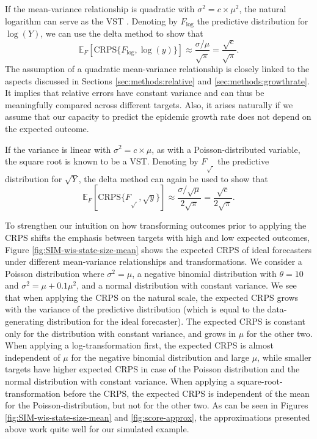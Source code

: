 \documentclass{article}
\begin{document}
If the mean-variance relationship is quadratic with $\sigma^2 = c \times \mu^2$, the natural logarithm can serve as the VST \citep{guerreroTimeseriesAnalysisSupported1993}. Denoting by $F_{\log}$ the predictive distribution for $\log(Y)$, we can use the delta method to show that
$$
\mathbb{E}_F[\text{CRPS}\{F_{\log}, \log(y)\}] \approx \frac{\sigma/\mu}{\sqrt{\pi}} 
= \frac{\sqrt{c}}{\sqrt{\pi}}
.
$$
The assumption of a quadratic mean-variance relationship is closely linked to the aspects discussed in Sections \ref{sec:methods:relative} and \ref{sec:methods:growthrate}. It implies that relative errors have constant variance and can thus be meaningfully compared across different targets. Also, it arises naturally if we assume that our capacity to predict the epidemic growth rate does not depend on the expected outcome.

If the variance is linear with $\sigma^2 = c \times \mu$, as with a Poisson-distributed variable, the square root is known to be a VST. 
Denoting by $F_{\sqrt{\ }}$ the predictive distribution for $\sqrt{Y}$, the delta method can again be used to show that
$$
\mathbb{E}_F[\text{CRPS}\{F_{\sqrt{\ }}, \sqrt{y}\}] \approx \frac{\sigma/\sqrt{\mu}}{2\sqrt{\pi}} = \frac{\sqrt{c}}{2\sqrt{\pi}}
.
$$

To strengthen our intuition on how transforming outcomes prior to applying the CRPS shifts the emphasis between targets with high and low expected outcomes, Figure \ref{fig:SIM-wis-state-size-mean} shows the expected CRPS of ideal forecasters under different mean-variance relationships and transformations. We consider a Poisson distribution where $\sigma^2 = \mu$, a negative binomial distribution with $\theta = 10$ and $\sigma^2 = \mu + 0.1\mu^2$, and a normal distribution with constant variance. We see that when applying the CRPS on the natural scale, the expected CRPS grows with the variance of the predictive distribution (which is equal to the data-generating distribution for the ideal forecaster). The expected CRPS is constant only for the distribution with constant variance, and grows in $\mu$ for the other two. When applying a log-transformation first, the expected CRPS is almost independent of $\mu$ for the negative binomial distribution and large $\mu$, while smaller targets have higher expected CRPS in case of the Poisson distribution and the normal distribution with constant variance. When applying a square-root-transformation before the CRPS, the expected CRPS is independent of the mean for the Poisson-distribution, but not for the other two. As can be seen in Figures \ref{fig:SIM-wis-state-size-mean} and \ref{fig:score-approx}, the approximations presented above work quite well for our simulated example. 
\end{document}
